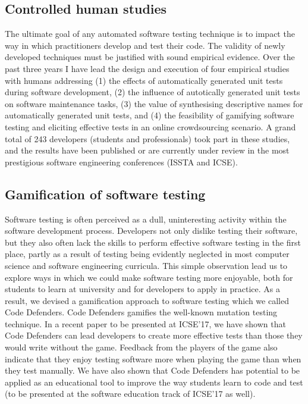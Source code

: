 \documentclass[a4paper]{article}
\begin{document}
\subsection{Controlled human studies}

The ultimate goal of any automated software testing technique is to
impact the way in which practitioners develop and test their code. The
validity of newly developed techniques must be justified with sound
empirical evidence. Over the past three years I have lead the design
and execution of four empirical studies with humans addressing (1) the
effects of automatically generated unit tests during software
development, (2) the influence of autotically generated unit tests on
software maintenance tasks, (3) the value of synthesising descriptive
names for automatically generated unit tests, and (4) the feasibility
of gamifying software testing and eliciting effective tests in an
online crowdsourcing scenario. A grand total of 243 developers
(students and professionals) took part in these studies, and the
results have been published or are currently under review in the most
prestigious software engineering conferences (ISSTA and ICSE).



\subsection{Gamification of software testing}

Software testing is often perceived as a dull, uninteresting activity
within the software development process. Developers not only dislike
testing their software, but they also often lack the skills to perform
effective software testing in the first place, partly as a result of
testing being evidently neglected in most computer science and
software engineering curricula. This simple observation lead us to
explore ways in which we could make software testing more enjoyable,
both for students to learn at university and for developers to apply
in practice. As a result, we devised a gamification approach to
software testing which we called Code Defenders. Code Defenders
gamifies the well-known mutation testing technique. In a recent paper
to be presented at ICSE'17, we have shown that Code Defenders can lead
developers to create more effective tests than those they would write
without the game. Feedback from the players of the game also indicate
that they enjoy testing software more when playing the game than when
they test manually. We have also shown that Code Defenders has
potential to be applied as an educational tool to improve the way
students learn to code and test (to be presented at the software
education track of ICSE'17 as well).
\end{document}

